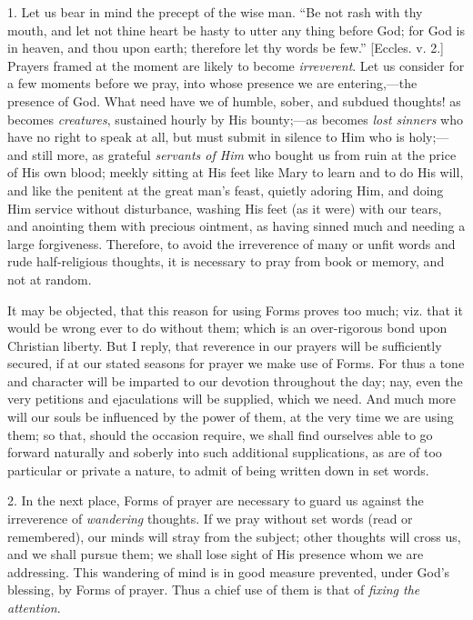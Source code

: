 1. Let us bear in mind the precept of the wise man.
``Be not rash with thy mouth, and let not thine heart
be hasty to utter any thing before God; for God is in
heaven, and thou upon earth; therefore let thy words be
few.'' [Eccles. v. 2.] Prayers framed at the moment
are likely to become \emph{irreverent}. Let us consider
for a few moments before we pray, into whose presence we
are entering,—the presence of God. What need have we
of humble, sober, and subdued thoughts! as becomes \emph{creatures},
sustained hourly by His bounty;—as becomes \emph{lost
sinners} who have no right to speak at all, but must
submit in silence to Him who is holy;—and still
more, as grateful \emph{servants of Him} who bought us
from ruin at the price of His own blood; meekly sitting
at His feet like Mary to learn and to do His will, and
like the penitent at the great man's feast, quietly
adoring Him, and doing Him service without disturbance,
washing His feet (as it were) with our tears, and
anointing them with precious ointment, as having sinned
much and needing a large forgiveness. Therefore, to avoid
the irreverence of many or unfit words and rude
half-religious thoughts, it is necessary to pray from
book or memory, and not at random.

It may be objected, that this reason for using Forms
proves too much; viz. that it would be wrong ever to do
without them; which is an over-rigorous bond upon
Christian liberty. But I reply, that reverence in our
prayers will be sufficiently secured, if at our stated
seasons for prayer we make use of Forms. For thus a tone
and character will be imparted to our devotion throughout
the day; nay, even the very petitions and ejaculations
will be supplied, which we need. And much more will our
souls be influenced by the power of them, at the very
time we are using them; so that, should the occasion
require, we shall find ourselves able to go forward
naturally and soberly into such additional supplications,
as are of too particular or private a nature, to admit of
being written down in set words.

2. In the next place, Forms of prayer are necessary to
guard us against the irreverence of \emph{wandering}
thoughts. If we pray without set words (read or
remembered), our minds will stray from the subject; other
thoughts will cross us, and we shall pursue them; we
shall lose sight of His presence whom we are addressing.
This wandering of mind is in good measure prevented,
under God's blessing, by Forms of prayer. Thus a chief
use of them is that of \emph{fixing the attention}.

